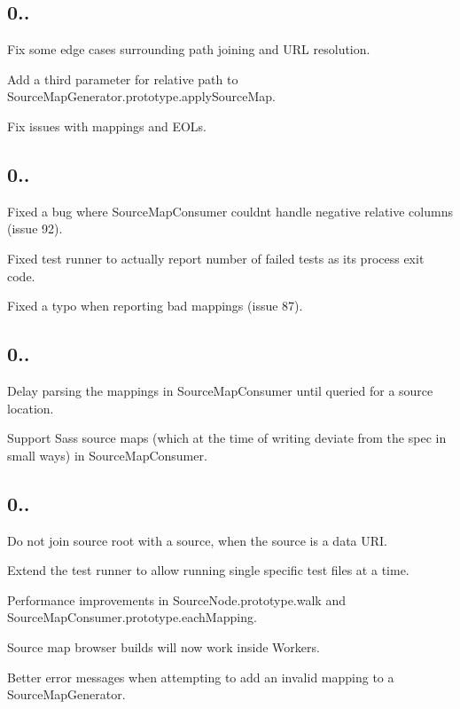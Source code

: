 \subsection*{0..}


\begin{DoxyItemize}
\item Fix some edge cases surrounding path joining and U\+RL resolution.
\item Add a third parameter for relative path to {\ttfamily Source\+Map\+Generator.\+prototype.\+apply\+Source\+Map}.
\item Fix issues with mappings and E\+O\+Ls.
\end{DoxyItemize}

\subsection*{0..}


\begin{DoxyItemize}
\item Fixed a bug where Source\+Map\+Consumer couldn\textquotesingle{}t handle negative relative columns (issue 92).
\item Fixed test runner to actually report number of failed tests as its process exit code.
\item Fixed a typo when reporting bad mappings (issue 87).
\end{DoxyItemize}

\subsection*{0..}


\begin{DoxyItemize}
\item Delay parsing the mappings in Source\+Map\+Consumer until queried for a source location.
\item Support Sass source maps (which at the time of writing deviate from the spec in small ways) in Source\+Map\+Consumer.
\end{DoxyItemize}

\subsection*{0..}


\begin{DoxyItemize}
\item Do not join source root with a source, when the source is a data U\+RI.
\item Extend the test runner to allow running single specific test files at a time.
\item Performance improvements in {\ttfamily Source\+Node.\+prototype.\+walk} and {\ttfamily Source\+Map\+Consumer.\+prototype.\+each\+Mapping}.
\item Source map browser builds will now work inside Workers.
\item Better error messages when attempting to add an invalid mapping to a {\ttfamily Source\+Map\+Generator}.
\end{DoxyItemize}

